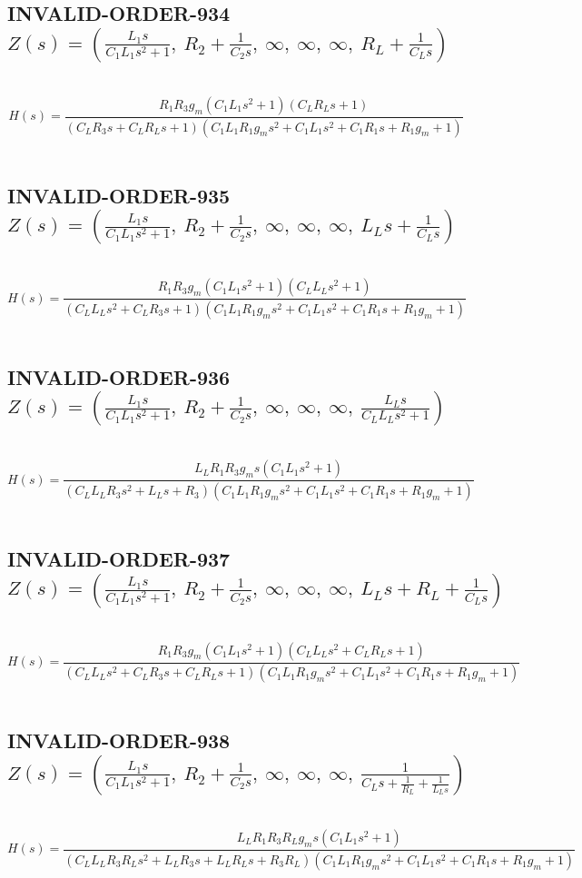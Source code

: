 \documentclass{article}
\begin{document}
\subsection{INVALID-ORDER-934 $Z(s) = \left( \frac{L_{1} s}{C_{1} L_{1} s^{2} + 1}, \  R_{2} + \frac{1}{C_{2} s}, \  \infty, \  \infty, \  \infty, \  R_{L} + \frac{1}{C_{L} s}\right)$ } \ 
\textbf{\[H(s) = \frac{R_{1} R_{3} g_{m} \left(C_{1} L_{1} s^{2} + 1\right) \left(C_{L} R_{L} s + 1\right)}{\left(C_{L} R_{3} s + C_{L} R_{L} s + 1\right) \left(C_{1} L_{1} R_{1} g_{m} s^{2} + C_{1} L_{1} s^{2} + C_{1} R_{1} s + R_{1} g_{m} + 1\right)}\] } \ 
\subsection{INVALID-ORDER-935 $Z(s) = \left( \frac{L_{1} s}{C_{1} L_{1} s^{2} + 1}, \  R_{2} + \frac{1}{C_{2} s}, \  \infty, \  \infty, \  \infty, \  L_{L} s + \frac{1}{C_{L} s}\right)$ } \ 
\textbf{\[H(s) = \frac{R_{1} R_{3} g_{m} \left(C_{1} L_{1} s^{2} + 1\right) \left(C_{L} L_{L} s^{2} + 1\right)}{\left(C_{L} L_{L} s^{2} + C_{L} R_{3} s + 1\right) \left(C_{1} L_{1} R_{1} g_{m} s^{2} + C_{1} L_{1} s^{2} + C_{1} R_{1} s + R_{1} g_{m} + 1\right)}\] } \ 
\subsection{INVALID-ORDER-936 $Z(s) = \left( \frac{L_{1} s}{C_{1} L_{1} s^{2} + 1}, \  R_{2} + \frac{1}{C_{2} s}, \  \infty, \  \infty, \  \infty, \  \frac{L_{L} s}{C_{L} L_{L} s^{2} + 1}\right)$ } \ 
\textbf{\[H(s) = \frac{L_{L} R_{1} R_{3} g_{m} s \left(C_{1} L_{1} s^{2} + 1\right)}{\left(C_{L} L_{L} R_{3} s^{2} + L_{L} s + R_{3}\right) \left(C_{1} L_{1} R_{1} g_{m} s^{2} + C_{1} L_{1} s^{2} + C_{1} R_{1} s + R_{1} g_{m} + 1\right)}\] } \ 
\subsection{INVALID-ORDER-937 $Z(s) = \left( \frac{L_{1} s}{C_{1} L_{1} s^{2} + 1}, \  R_{2} + \frac{1}{C_{2} s}, \  \infty, \  \infty, \  \infty, \  L_{L} s + R_{L} + \frac{1}{C_{L} s}\right)$ } \ 
\textbf{\[H(s) = \frac{R_{1} R_{3} g_{m} \left(C_{1} L_{1} s^{2} + 1\right) \left(C_{L} L_{L} s^{2} + C_{L} R_{L} s + 1\right)}{\left(C_{L} L_{L} s^{2} + C_{L} R_{3} s + C_{L} R_{L} s + 1\right) \left(C_{1} L_{1} R_{1} g_{m} s^{2} + C_{1} L_{1} s^{2} + C_{1} R_{1} s + R_{1} g_{m} + 1\right)}\] } \ 
\subsection{INVALID-ORDER-938 $Z(s) = \left( \frac{L_{1} s}{C_{1} L_{1} s^{2} + 1}, \  R_{2} + \frac{1}{C_{2} s}, \  \infty, \  \infty, \  \infty, \  \frac{1}{C_{L} s + \frac{1}{R_{L}} + \frac{1}{L_{L} s}}\right)$ } \ 
\textbf{\[H(s) = \frac{L_{L} R_{1} R_{3} R_{L} g_{m} s \left(C_{1} L_{1} s^{2} + 1\right)}{\left(C_{L} L_{L} R_{3} R_{L} s^{2} + L_{L} R_{3} s + L_{L} R_{L} s + R_{3} R_{L}\right) \left(C_{1} L_{1} R_{1} g_{m} s^{2} + C_{1} L_{1} s^{2} + C_{1} R_{1} s + R_{1} g_{m} + 1\right)}\] } \ 
\end{document}
